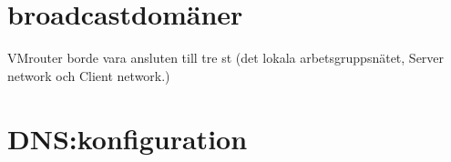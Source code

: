 \documentclass[swedish,10pt,a4paper]{article}
\begin{document}

\section{broadcastdomäner}
\label{sec:broadcastdomains}

VMrouter borde vara ansluten till tre st (det lokala arbetsgruppsnätet, Server network och Client network.)

\section{DNS:konfiguration}
\label{sec:dns_konf}







\end{document}
